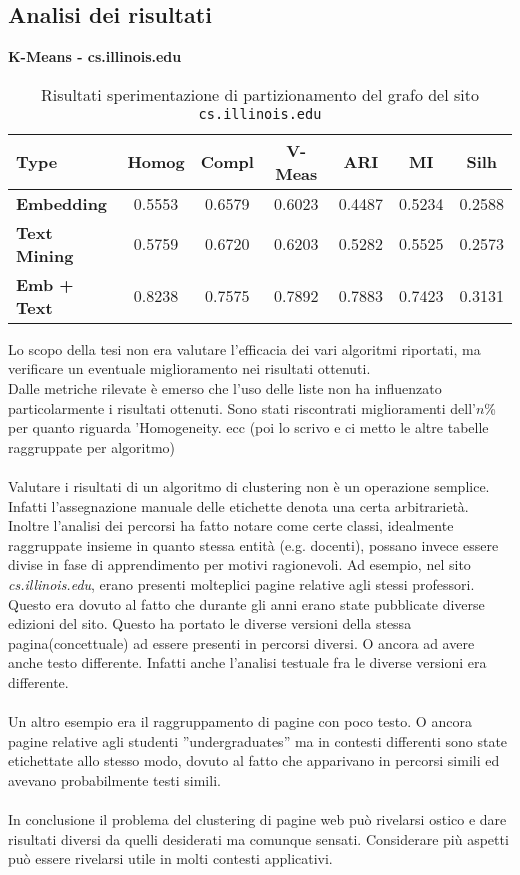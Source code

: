 \subsection{Analisi dei risultati}
\textbf{K-Means - cs.illinois.edu}
\begin{table}[H]
	\begin{tabular}{| l | c | c | c | c | c | c |}
	\hline
	\textbf{Type}  & \textbf{Homog} & \textbf{Compl} & \textbf{V-Meas}  & \textbf{ARI}  & \textbf{MI}  & \textbf{Silh} \\ [3ex] \hline
	\textbf{Embedding} & 0.5553 & 0.6579 & 0.6023 & 0.4487 & 0.5234 & 0.2588\\ [3ex]
	 \hline 
	\textbf{Text Mining} & 0.5759 & 0.6720 & 0.6203 & 0.5282 & 0.5525 & 0.2573\\ [3ex]
	 \hline
	\textbf{Emb + Text} & 0.8238 & 0.7575 & 0.7892 & 0.7883 & 0.7423 & 0.3131\\ [3ex]
	 \hline
	\end{tabular}
	\caption{Risultati sperimentazione di partizionamento del grafo del sito \texttt{cs.illinois.edu}}
	\label{metricheEmbed}
\end{table}

Lo scopo della tesi non era valutare l'efficacia dei vari algoritmi riportati, ma verificare un eventuale miglioramento nei risultati ottenuti.
\\
Dalle metriche rilevate è emerso che l'uso delle liste non ha influenzato particolarmente i risultati ottenuti. Sono stati riscontrati miglioramenti dell'$n$\% per quanto riguarda 'Homogeneity. ecc \color{red} (poi lo scrivo e ci metto le altre tabelle raggruppate per algoritmo) \color{black}
\\\\
Valutare i risultati di un algoritmo di clustering non è un operazione semplice. Infatti l'assegnazione manuale delle etichette denota una certa arbitrarietà. 
\\Inoltre l'analisi dei percorsi ha fatto notare come certe classi, idealmente raggruppate insieme in quanto stessa entità (e.g. docenti), possano invece essere divise in fase di apprendimento per motivi ragionevoli. Ad esempio, nel sito \textit{cs.illinois.edu}, erano presenti molteplici pagine relative agli stessi professori. Questo era dovuto al fatto che durante gli anni erano state pubblicate diverse edizioni del sito. Questo ha portato le diverse versioni della stessa pagina(concettuale) ad essere presenti in percorsi diversi. O ancora ad avere anche testo differente. Infatti anche l'analisi testuale fra le diverse versioni era differente. 
\\\\
Un altro esempio era il raggruppamento di pagine con poco testo. O ancora pagine relative agli studenti ''undergraduates'' ma in contesti differenti sono state etichettate allo stesso modo, dovuto al fatto che apparivano in percorsi simili ed avevano probabilmente testi simili.
\\\\
In conclusione il problema del clustering di pagine web può rivelarsi ostico e dare risultati diversi da quelli desiderati ma comunque sensati. Considerare più aspetti può essere rivelarsi utile in molti contesti applicativi.

